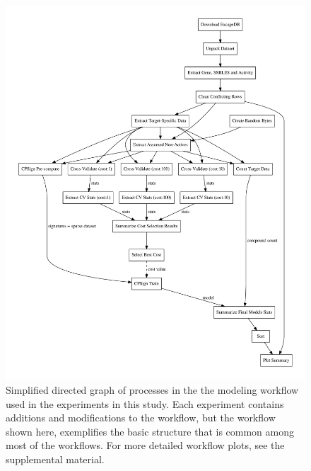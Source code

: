 \documentclass[10pt,article]{memoir}
\begin{document}
\begin{figure}[h!]
\includegraphics[width=\textwidth]{figures/workflow_graph_clean.pdf}
    \caption{Simplified directed graph of processes in the the modeling workflow used
    in the experiments in this study. Each experiment contains additions and modifications
    to the workflow, but the workflow shown here, exemplifies the basic structure
    that is common among most of the workflows. For more detailed workflow
    plots, see the supplemental material.}
    \label{fig:workflow_graph_clean}
\end{figure}
\end{document}
